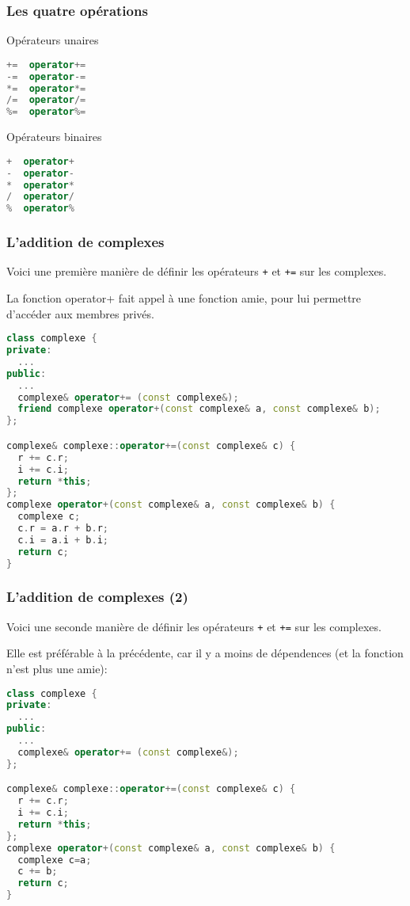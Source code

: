 \documentclass{beamer}
\begin{document}
\begin{frame}[fragile=singleslide,shrink=20]
\frametitle {Les quatre opérations}

\begin{block}{Opérateurs unaires}
\begin{lstlisting}[language=c++]
+=  operator+=
-=  operator-=
*=  operator*=
/=  operator/=
%=  operator%=
\end{lstlisting}
\end{block}

\begin{block}{Opérateurs binaires}
\begin{lstlisting}[language=c++]
+  operator+
-  operator-
*  operator*
/  operator/
%  operator%
\end{lstlisting}
\end{block}
\end{frame}

\begin{frame}[fragile=singleslide,shrink=20]
\frametitle {L'addition de complexes}

Voici une première manière de définir les opérateurs \texttt{+} et \texttt{+=} sur les complexes.

La fonction operator+ fait appel à une fonction amie, pour lui permettre d'accéder aux membres privés.
\begin{lstlisting}[language=c++]
class complexe {
private:
  ...
public:
  ...
  complexe& operator+= (const complexe&);
  friend complexe operator+(const complexe& a, const complexe& b);
};

complexe& complexe::operator+=(const complexe& c) {
  r += c.r;
  i += c.i;
  return *this;
};
complexe operator+(const complexe& a, const complexe& b) {
  complexe c;
  c.r = a.r + b.r;
  c.i = a.i + b.i;
  return c;
}
\end{lstlisting}
\end{frame}

\begin{frame}[fragile=singleslide,shrink=20]
\frametitle {L'addition de complexes (2)}

Voici une seconde manière de définir les opérateurs \texttt{+} et \texttt{+=} sur les complexes.

Elle est préférable à la précédente, car il y a moins de dépendences (et la fonction n'est plus une amie):
\begin{lstlisting}[language=c++]
class complexe {
private:
  ...
public:
  ...
  complexe& operator+= (const complexe&);
};

complexe& complexe::operator+=(const complexe& c) {
  r += c.r;
  i += c.i;
  return *this;
};
complexe operator+(const complexe& a, const complexe& b) {
  complexe c=a;
  c += b;
  return c;
}
\end{lstlisting}
\end{frame}
\end{document}
